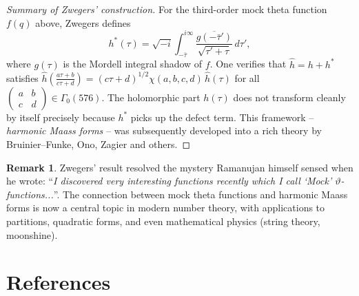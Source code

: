 \documentclass[12pt,a4paper]{amsart}
\theoremstyle{definition}
\newtheorem{remark}[theorem]{Remark}
\begin{document}
\begin{proof}[Summary of Zwegers' construction]
For the third-order mock theta function $f(q)$ above,
Zwegers defines
\[
  h^*(\tau) = \sqrt{-i}\int_{-\bar\tau}^{i\infty}
  \frac{\overline{g(-\bar\tau')}}{\sqrt{\tau'+\tau}}\,d\tau',
\]
where $g(\tau)$ is the Mordell integral shadow of $f$.
One verifies that $\widehat{h} = h + h^*$ satisfies
$\widehat{h}\!\left(\frac{a\tau+b}{c\tau+d}\right) = (c\tau+d)^{1/2}\chi(a,b,c,d)\,\widehat{h}(\tau)$
for all $\begin{pmatrix}a&b\\c&d\end{pmatrix}\in\Gamma_0(576)$.
The holomorphic part $h(\tau)$ does not transform cleanly by itself precisely because
$h^*$ picks up the defect term.
This framework -- \emph{harmonic Maass forms} -- was subsequently developed into
a rich theory by Bruinier--Funke, Ono, Zagier and others.
\end{proof}

\begin{remark}
Zwegers' result resolved the mystery Ramanujan himself sensed when he wrote:
``\textit{I discovered very interesting functions recently which I call `Mock' $\vartheta$-functions...}''.
The connection between mock theta functions and harmonic Maass forms is now a central
topic in modern number theory, with applications to partitions, quadratic forms,
and even mathematical physics (string theory, moonshine).
\end{remark}

\section*{References}
\end{document}
